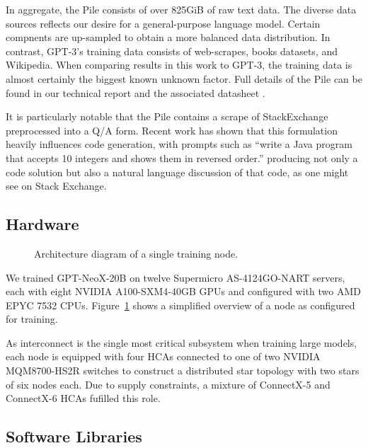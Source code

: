 \documentclass{article}
\newcommand{\model}{GPT-NeoX-20B}
\begin{document}
In aggregate, the Pile consists of over 825GiB of raw text data. The diverse data sources reflects our desire for a general-purpose language model. Certain compnents are up-sampled to obtain a more balanced data distribution. In contrast, GPT-3's training data consists of web-scrapes, books datasets, and Wikipedia. When comparing results in this work to GPT-3, the training data is almost certainly the biggest known unknown factor. Full details of the Pile can be found in our technical report \citep{gao2020pile} and the associated datasheet \citep{biderman2022datasheet}.

It is particularly notable that the Pile contains a scrape of StackExchange preprocessed into a Q/A form. Recent work \citep{biderman2022neural} has shown that this formulation heavily influences code generation, with prompts such as ``write a Java program that accepts 10 integers and shows them in reversed order.'' producing not only a code solution but also a natural language discussion of that code, as one might see on Stack Exchange.

\subsection{Hardware}
\begin{figure}[h]
    \centering
    
    \caption{Architecture diagram of a single training node.}
    \label{fig:training-node}
\end{figure}

We trained \model{} on twelve Supermicro AS-4124GO-NART servers, each with eight NVIDIA A100-SXM4-40GB GPUs and configured with two AMD EPYC 7532 CPUs. Figure~\ref{fig:training-node} shows a simplified overview of a node as configured for training.

As interconnect is the single most critical subsystem when training large models, each node is equipped with four HCAs connected to one of two NVIDIA MQM8700-HS2R switches to construct a distributed star topology with two stars of six nodes each. Due to supply constraints, a mixture of ConnectX-5 and ConnectX-6 HCAs fufilled this role.

\subsection{Software Libraries}
\end{document}
